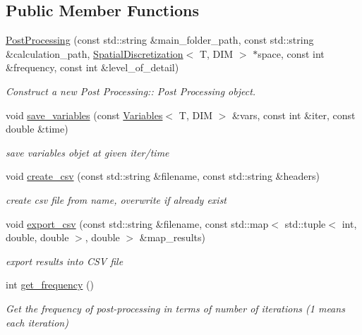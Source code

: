 \subsection*{Public Member Functions}
\begin{DoxyCompactItemize}
\item 
\hyperlink{classPostProcessing_a1a7d26c5723dd72ed8fc84eb9e6c6d96}{Post\+Processing} (const std\+::string \&main\+\_\+folder\+\_\+path, const std\+::string \&calculation\+\_\+path, \hyperlink{classSpatialDiscretization}{Spatial\+Discretization}$<$ T, D\+IM $>$ $\ast$space, const int \&frequency, const int \&level\+\_\+of\+\_\+detail)
\begin{DoxyCompactList}\small\item\em Construct a new Post Processing\+:\+: Post Processing object. \end{DoxyCompactList}\item 
void \hyperlink{classPostProcessing_a5872fc7f3527be648339ec33e9536578}{save\+\_\+variables} (const \hyperlink{classVariables}{Variables}$<$ T, D\+IM $>$ \&vars, const int \&iter, const double \&time)
\begin{DoxyCompactList}\small\item\em save variables objet at given iter/time \end{DoxyCompactList}\item 
void \hyperlink{classPostProcessing_a01429a9b4b583e48cd9c4125fb5e85a7}{create\+\_\+csv} (const std\+::string \&filename, const std\+::string \&headers)
\begin{DoxyCompactList}\small\item\em create csv file from name, overwrite if already exist \end{DoxyCompactList}\item 
void \hyperlink{classPostProcessing_a0a7dab69d6e8871063ff9851393b7f86}{export\+\_\+csv} (const std\+::string \&filename, const std\+::map$<$ std\+::tuple$<$ int, double, double $>$, double $>$ \&map\+\_\+results)
\begin{DoxyCompactList}\small\item\em export results into C\+SV file \end{DoxyCompactList}\item 
int \hyperlink{classPostProcessing_a910c85495a35f8e3303c17ece732fdcd}{get\+\_\+frequency} ()
\begin{DoxyCompactList}\small\item\em Get the frequency of post-\/processing in terms of number of iterations (1 means each iteration) \end{DoxyCompactList}\item 

\end{DoxyCompactItemize}
